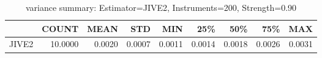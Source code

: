 \begin{table}[ht]
\centering
\caption{variance summary: Estimator=JIVE2, Instruments=200, Strength=0.90}
\begin{tabular}{lrrrrrrrr}
\toprule
 & COUNT & MEAN & STD & MIN & 25\% & 50\% & 75\% & MAX \\
\midrule
JIVE2 & 10.0000 & 0.0020 & 0.0007 & 0.0011 & 0.0014 & 0.0018 & 0.0026 & 0.0031 \\
\bottomrule
\end{tabular}
\end{table}
